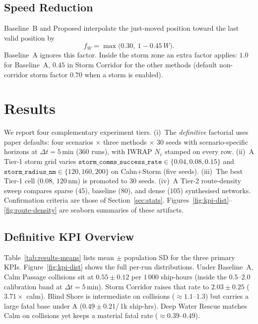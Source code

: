 \documentclass[cameraready]{Interspeech}
\begin{document}
\subsection{Speed Reduction}
\label{sec:speed}

Baseline~B and Proposed interpolate the just-moved position toward the last valid position by
\begin{equation*}
  f_W = \max\big(0.30,\ 1 - 0.45\,W\big).
\end{equation*}
Baseline~A ignores this factor. Inside the storm zone an extra factor applies: $1.0$ for Baseline~A, $0.45$ in Storm Corridor for the other methods (default non-corridor storm factor $0.70$ when a storm is enabled).

\section{Results}
\label{sec:results}

We report four complementary experiment tiers. (i)~The \emph{definitive} factorial uses paper defaults: four scenarios $\times$ three methods $\times$ $30$ seeds with scenario-specific horizons at $\Delta t=5$\,min ($360$ runs), with IWRAP $N_c$ stamped on every row. (ii)~A Tier-1 storm grid varies $\texttt{storm\_comms\_success\_rate}\in\{0.04,0.08,0.15\}$ and $\texttt{storm\_radius\_nm}\in\{120,160,200\}$ on Calm+Storm (five seeds). (iii)~The best Tier-1 cell ($0.08$, $120$\,nm) is promoted to $30$ seeds. (iv)~A Tier-2 route-density sweep compares sparse ($45$), baseline ($80$), and dense ($105$) synthesised networks. Confirmation criteria are those of Section~\ref{sec:stats}. Figures~\ref{fig:kpi-dist}--\ref{fig:route-density} are seaborn summaries of these artifacts.

\subsection{Definitive KPI Overview}
\label{sec:results-overview}

Table~\ref{tab:results-means} lists mean $\pm$ population SD for the three primary KPIs. Figure~\ref{fig:kpi-dist} shows the full per-run distributions. Under Baseline~A, Calm Passage collisions sit at $0.55\pm0.12$ per $1\,000$ ship-hours (inside the $0.5$--$2.0$ calibration band at $\Delta t=5$\,min). Storm Corridor raises that rate to $2.03\pm0.25$ ($3.71\times$ calm). Blind Shore is intermediate on collisions ($\approx1.1$--$1.3$) but carries a large fatal base under A ($0.49\pm0.21$/\,1k ship-hrs). Deep Water Rescue matches Calm on collisions yet keeps a material fatal rate ($\approx0.39$--$0.49$).
\end{document}
